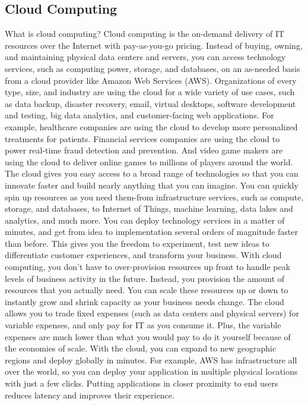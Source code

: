 \subsection{Cloud Computing}
What is cloud computing? Cloud computing is the on-demand delivery of IT resources over the Internet with pay-as-you-go pricing. Instead of buying, owning, and maintaining physical data centers and servers, you can access technology services, such as computing power, storage, and databases, on an as-needed basis from a cloud provider like Amazon Web Services (AWS). Organizations of every type, size, and industry are using the cloud for a wide variety of use cases, such as data backup, disaster recovery, email, virtual desktops, software development and testing, big data analytics, and customer-facing web applications. For example, healthcare companies are using the cloud to develop more personalized treatments for patients. Financial services companies are using the cloud to power real-time fraud detection and prevention. And video game makers are using the cloud to deliver online games to millions of players around the world. 
The cloud gives you easy access to a broad range of technologies so that you can innovate faster and build nearly anything that you can imagine. You can quickly spin up resources as you need them-from infrastructure services, such as compute, storage, and databases, to Internet of Things, machine learning, data lakes and analytics, and much more. You can deploy technology services in a matter of minutes, and get from idea to implementation several orders of magnitude faster than before. This gives you the freedom to experiment, test new ideas to differentiate customer experiences, and transform your business.
With cloud computing, you don't have to over-provision resources up front to handle peak levels of business activity in the future. Instead, you provision the amount of resources that you actually need. You can scale these resources up or down to instantly grow and shrink capacity as your business needs change.
The cloud allows you to trade fixed expenses (such as data centers and physical servers) for variable expenses, and only pay for IT as you consume it. Plus, the variable expenses are much lower than what you would pay to do it yourself because of the economies of scale. 
With the cloud, you can expand to new geographic regions and deploy globally in minutes. For example, AWS has infrastructure all over the world, so you can deploy your application in multiple physical locations with just a few clicks. Putting applications in closer proximity to end users reduces latency and improves their experience. 
